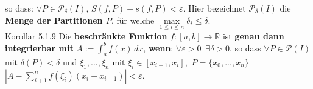 \documentclass[landscape, 10pt]{article}
\newcommand{\R}{\mathbb{R}}
\begin{document}
\begin{multicols}{3}
                     so dass: \textcolor{NavyBlue}{
                     $\forall P\in\mathcal{P}_\delta(I),\,S(f,P)-s(f,P)<\varepsilon$}.
                     Hier bezeichnet 
                     \textcolor{NavyBlue}{$\mathcal{P}_\delta(I)$} die 
                     \textbf{Menge der Partitionen $P$}, für welche 
                     \textcolor{NavyBlue}{
                     $\max\limits_{1\leqslant i\leqslant n}\delta_i
                     \leqslant\delta$}. \\
              \colorbox{BurntOrange}{Korollar 5.1.9} 
                     Die \textbf{beschränkte Funktion} 
                     \textcolor{NavyBlue}{$f:[a,b]\longrightarrow\R$} ist 
                     \textbf{genau dann integrierbar mit}
                     \textcolor{NavyBlue}{$A:=\int_a^bf(x)\,dx$}, 
                     \textbf{wenn}: 
                     \textcolor{NavyBlue}{
                     $\forall\varepsilon>0\enspace\exists\delta>0$}, so dass 
                     \textcolor{NavyBlue}{$\forall P\in\mathcal{P}(I)$} mit 
                     \textcolor{NavyBlue}{$\delta(P)<\delta$}
                     und \textcolor{NavyBlue}{$\xi_1,...,\xi_n$} mit 
                     \textcolor{NavyBlue}{$\xi_i\in[x_{i-1},x_i]$},\,
                     \textcolor{NavyBlue}{$P=\{x_0,...,x_n\}$} 
                     \textcolor{NavyBlue}{
                     $|A-\sum_{i+1}^nf(\xi_i)(x_i-x_{i-1})|
                     <\varepsilon$}.

\end{multicols}
\end{document}
